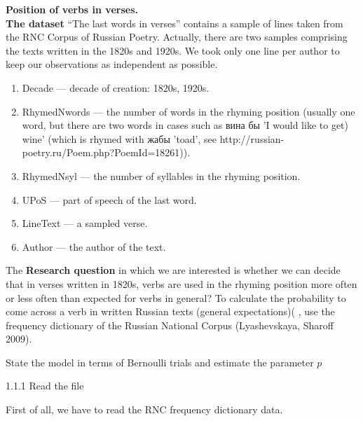 	\begin{ExerciseList}
	\Exercise \textbf{ Position of verbs in verses.}\\
	\textbf{The dataset} “The last words in verses” contains a sample of lines taken from the RNC Corpus of Russian Poetry. Actually, there are two samples comprising the texts written in the 1820s and 1920s. We took only one line per author to keep our observations as independent as possible.
	\begin{enumerate}
		\item	Decade — decade of creation: 1820s, 1920s.
	
		\item RhymedNwords — the number of words in the rhyming position (usually one word, but there are two words in cases such as вина бы 'I would like to get) wine' (which is rhymed with жабы 'toad', see http://russian-poetry.ru/Poem.php?PoemId=18261)).
	
		\item RhymedNsyl — the number of syllables in the rhyming position.
	
		\item UPoS — part of speech of the last word.
	
		\item LineText — a sampled verse.
	
		\item Author — the author of the text.
	
	\end{enumerate}
	The \textbf{Research question} in which we are interested is whether we can decide that in verses written in 1820s, verbs are used in the rhyming position more often or less often than expected for verbs in general?
	To calculate the probability to come across a verb in written Russian texts (general expectations)( 
 , use the frequency dictionary of the Russian National Corpus (Lyashevskaya, Sharoff 2009).
	
		\Question State the model in terms of Bernoulli trials and estimate the parameter $p$ 
	

	1.1.1 Read the file
	
	\Question First of all, we have to read the RNC frequency dictionary data.
	
	
	

\end{ExerciseList}
